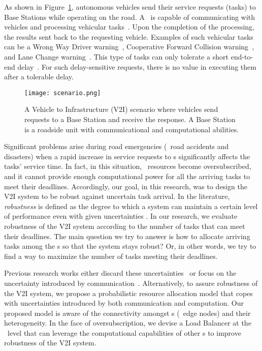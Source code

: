 \documentclass[11pt,a4paper]{article}
\begin{document}
As shown in Figure~\ref{fig:scen}, autonomous vehicles send their service requests (tasks) to Base Stations while operating on the road. A \bs \ is capable of communicating with vehicles and processing vehicular tasks~\cite{bok2016multiple}. Upon the completion of the processing, the results sent back to the requesting vehicle. Examples of such vehicular tasks can be a Wrong Way Driver warning~\cite{ABIresearch}, Cooperative Forward Collision warning~\cite{ElBatt}, and Lane Change warning~\cite{ABIresearch}. This type of tasks can only tolerate a short end-to-end delay~\cite{ali2011co}. For such delay-sensitive requests, there is no value in executing them after a tolerable delay.


\begin{figure}[!h]
\centering
\texttt{[image: scenario.png]}
\caption{A Vehicle to Infrastructure (V2I) scenario where vehicles send requests to a Base Station and receive the response. A Base Station is a roadside unit with communicational and computational abilities.}
\label{fig:scen}
\end{figure}


Significant problems arise during road emergencies (\eg \ road accidents and disasters) when a rapid increase in service requests to \bs s significantly affects the tasks' service time. In fact, in this situation, \bs \ resources become oversubscribed, and it cannot provide enough computational power for all the arriving tasks to meet their deadlines. Accordingly, our goal, in this research, was to design the V2I system to be robust against uncertain task arrival. In the literature, \emph{robustness} is defined as the degree to which a system can maintain a certain level of performance even with given uncertainties \cite{ali2004measuring, smith2009robust, canon2010evaluation}. In our research, we evaluate robustness of the V2I system according to the number of tasks that can meet their deadlines. The main question we try to answer is how to allocate arriving tasks among the \bs s so that the system stays robust? Or, in other words, we try to find a way to maximize the number of tasks meeting their deadlines. 

Previous research works either discard these uncertainties~\cite{bok2016multiple} or focus on the uncertainty introduced by communication~\cite{ali2011co}. Alternatively, to assure robustness of the V2I system, we propose a probabilistic resource allocation model that copes with uncertainties introduced by both communication and computation. Our proposed model is aware of the connectivity amongst \bs s (\ie \ edge nodes) and their heterogeneity. In the face of oversubscription, we devise a Load Balancer at the \bs~level that can leverage the computational capabilities of other \bs s to improve robustness of the V2I system.
\end{document}
